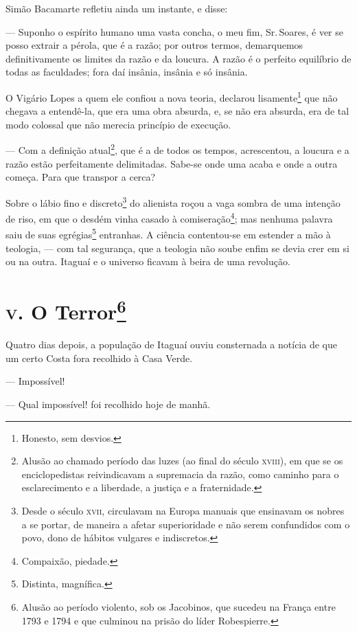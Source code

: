 Simão Bacamarte refletiu ainda um instante, e disse:

--- Suponho o espírito humano uma vasta concha, o meu fim, Sr.\,Soares, é
ver se posso extrair a pérola, que é a razão; por outros termos,
demarquemos definitivamente os limites da razão e da loucura. A razão é
o perfeito equilíbrio de todas as faculdades; fora daí insânia, insânia
e só insânia.

O Vigário Lopes a quem ele confiou a nova teoria, declarou
lisamente\footnote{Honesto, sem desvios.} que não chegava a entendê-la,
que era uma obra absurda, e, se não era absurda, era de tal modo
colossal que não merecia princípio de execução.

--- Com a definição atual\footnote{Alusão ao chamado período das luzes
  (ao final do século \textsc{xviii}), em que se os enciclopedistas reivindicavam
  a supremacia da razão, como caminho para o esclarecimento e a
  liberdade, a justiça e a fraternidade.}, que é a de todos os tempos,
acrescentou, a loucura e a razão estão perfeitamente delimitadas.
Sabe-se onde uma acaba e onde a outra começa. Para que transpor a cerca?

Sobre o lábio fino e discreto\footnote{Desde o século \textsc{xvii}, circulavam
  na Europa manuais que ensinavam os nobres a se portar, de maneira a
  afetar superioridade e não serem confundidos com o povo, dono de
  hábitos vulgares e indiscretos.} do alienista roçou a vaga sombra de
uma intenção de riso, em que o desdém vinha casado à
comiseração\footnote{Compaixão, piedade.}; mas nenhuma palavra saiu de
suas egrégias\footnote{Distinta, magnífica.} entranhas. A ciência
contentou-se em estender a mão à teologia, --- com tal segurança, que a
teologia não soube enfim se devia crer em si ou na outra. Itaguaí e o
universo ficavam à beira de uma revolução.

\section*{\textsc{v.} O Terror\protect\footnote[*]{\MakeUppercase{A}lusão ao período violento, sob os \MakeUppercase{J}acobinos, que sucedeu na \MakeUppercase{F}rança entre 1793 e 1794 e que culminou na prisão do líder \MakeUppercase{R}obespierre.}}

Quatro dias depois, a população de Itaguaí ouviu consternada a notícia
de que um certo Costa fora recolhido à Casa Verde.

--- Impossível!

--- Qual impossível! foi recolhido hoje de manhã.

